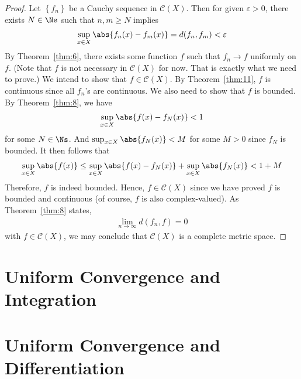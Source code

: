 \documentclass[thmcnt=section, 12pt]{elegantbook}
\begin{document}
\begin{proof}
    Let $\left\{f_n\right\}$ be a Cauchy sequence in $\mathscr{C}(X)$. Then for given $\varepsilon > 0$, there exists $N \in \Ns$ such that $n, m \geq N$ implies 
    \begin{align*}
        \sup_{x \in X}\abs{f_n(x) - f_m(x)}= d(f_n, f_m) < \varepsilon
    \end{align*}
    By Theorem~\ref{thm:6}, there exists some function $f$ such that $f_n \to f$ uniformly on $f$. (Note that $f$ is not necessary in $\mathscr{C}(X)$ for now. That is exactly what we need to prove.) We intend to show that $f \in \mathscr{C}(X)$. By Theorem~\ref{thm:11}, $f$ is continuous since all $f_n$'s are continuous. We also need to show that $f$ is bounded. By Theorem~\ref{thm:8}, we have 
    \begin{align*}
        \sup_{x \in X} \abs{f(x) - f_N(x)} < 1
    \end{align*}
    for some $N \in \Ns$. And $\sup_{x \in X}\abs{f_N(x)} < M$ for some $M > 0$ since $f_N$ is bounded. It then follows that 
    \begin{align*}
        \sup_{x \in X} \abs{f(x)}
        \leq \sup_{x \in X} \abs{f(x) - f_N(x)} + \sup_{x \in X}\abs{f_N(x)}
        < 1 + M
    \end{align*}
    Therefore, $f$ is indeed bounded. Hence, $f \in \mathscr{C}(X)$ since we have proved $f$ is bounded and continuous (of course, $f$ is also complex-valued). As Theorem~\ref{thm:8} states,
    \begin{align*}
        \lim_{n \to \infty} d(f_n, f) = 0
    \end{align*}
    with $f \in \mathscr{C}(X)$, we may conclude that $\mathscr{C}(X)$ is a complete metric space.
\end{proof}


\section{Uniform Convergence and Integration}



\section{Uniform Convergence and Differentiation}

\end{document}
